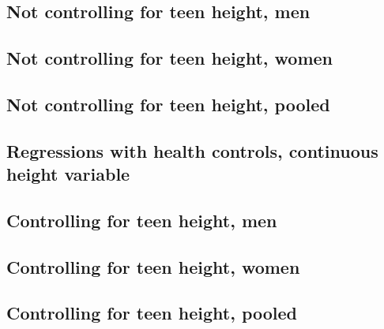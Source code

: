 \begin{landscape}
\subsection{Not controlling for teen height, men}

\end{landscape}

\begin{landscape}
\subsection{Not controlling for teen height, women}

\end{landscape}

\begin{landscape}
\subsection{Not controlling for teen height, pooled}

\end{landscape}


\begin{landscape}
\section{Regressions with health controls, continuous height variable}
\subsection{Controlling for teen height, men}

\end{landscape}

\begin{landscape}
\subsection{Controlling for teen height, women}

\end{landscape}

\begin{landscape}
\subsection{Controlling for teen height, pooled}

\end{landscape}

